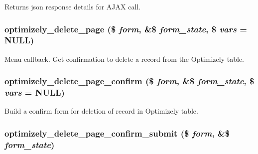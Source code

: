 \begin{DoxyReturn}{Returns}
json response details for AJAX call. 
\end{DoxyReturn}
\hypertarget{optimizely_8admin_8inc_add00991770834a3d58f001f83dfdd28c}{
\subsubsection[{optimizely\_\-delete\_\-page}]{\setlength{\rightskip}{0pt plus 5cm}optimizely\_\-delete\_\-page (\$ {\em form}, \/  \&\$ {\em form\_\-state}, \/  \$ {\em vars} = {\ttfamily NULL})}}
\label{optimizely_8admin_8inc_add00991770834a3d58f001f83dfdd28c}
Menu callback. Get confirmation to delete a record from the Optimizely table. \hypertarget{optimizely_8admin_8inc_add000bbe43a0d21f9521fe292cd81d65}{
\subsubsection[{optimizely\_\-delete\_\-page\_\-confirm}]{\setlength{\rightskip}{0pt plus 5cm}optimizely\_\-delete\_\-page\_\-confirm (\$ {\em form}, \/  \&\$ {\em form\_\-state}, \/  \$ {\em vars} = {\ttfamily NULL})}}
\label{optimizely_8admin_8inc_add000bbe43a0d21f9521fe292cd81d65}
Build a confirm form for deletion of record in Optimizely table. \hypertarget{optimizely_8admin_8inc_aa159c6fba81a52d6b39438ea4739ead4}{
\subsubsection[{optimizely\_\-delete\_\-page\_\-confirm\_\-submit}]{\setlength{\rightskip}{0pt plus 5cm}optimizely\_\-delete\_\-page\_\-confirm\_\-submit (\$ {\em form}, \/  \&\$ {\em form\_\-state})}}
\label{optimizely_8admin_8inc_aa159c6fba81a52d6b39438ea4739ead4}
